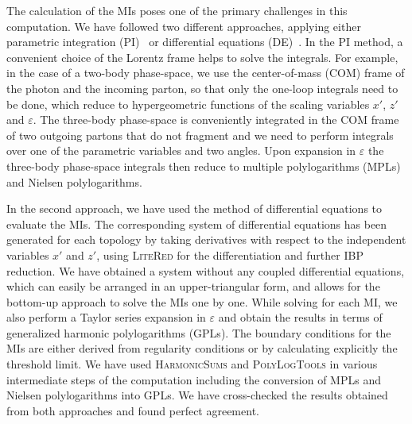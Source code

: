 \documentclass[%
 twocolumn,
 superscriptaddress,
 preprintnumbers,
 nofootinbib,
 amsmath,amssymb,
 aps,
 prl,
]{revtex4}
\begin{document}
The calculation of the MIs poses one of the primary challenges in this computation. 
We have followed two different approaches, applying either parametric integration (PI)~\cite{Matsuura:1988sm,Zijlstra:1992qd,Rijken:1996ns,Ravindran:2003um}
or differential equations (DE)~\cite{Kotikov:1990kg,Argeri:2007up,Remiddi:1997ny,Henn:2013pwa,Ablinger:2015tua}.
In the PI method, a convenient choice of the Lorentz frame helps to solve the integrals.
For example, in the case of a two-body phase-space, we use the center-of-mass (COM) frame of the photon and the incoming parton, so that only the one-loop integrals need to be done, which reduce to hypergeometric functions of the scaling variables
$x'$, $z'$ and $\varepsilon$.
The three-body phase-space is conveniently integrated in the COM frame of two outgoing partons that do not fragment and we need to perform integrals over one of the parametric variables and two angles. Upon expansion in $\varepsilon$ the three-body phase-space integrals then reduce to multiple polylogarithms (MPLs) and Nielsen polylogarithms.

In the second approach, we have used the method of differential equations
to evaluate the MIs. 
The corresponding system of differential equations has been generated for each topology by taking derivatives with respect to the independent variables $x'$ and $z'$, using \textsc{LiteRed} for the differentiation and further IBP reduction.
We have obtained a system without any coupled differential equations, which can easily be arranged in an upper-triangular form, and allows for the bottom-up approach to solve the MIs one by one.
While solving for each MI, we also perform a Taylor series expansion in $\varepsilon$ and obtain the results
in terms of generalized harmonic polylogarithms (GPLs).
The boundary conditions for the MIs are either derived from regularity conditions or by calculating explicitly the threshold limit.
We have used \textsc{HarmonicSums} \cite{Ablinger:2010kw,Ablinger:2011te,Ablinger:2014rba}  and \textsc{PolyLogTools} 
\cite{Duhr:2019tlz} in various intermediate steps
of the computation including the conversion of MPLs and Nielsen polylogarithms into GPLs.
We have cross-checked the results obtained from both approaches and found perfect agreement.
\end{document}
